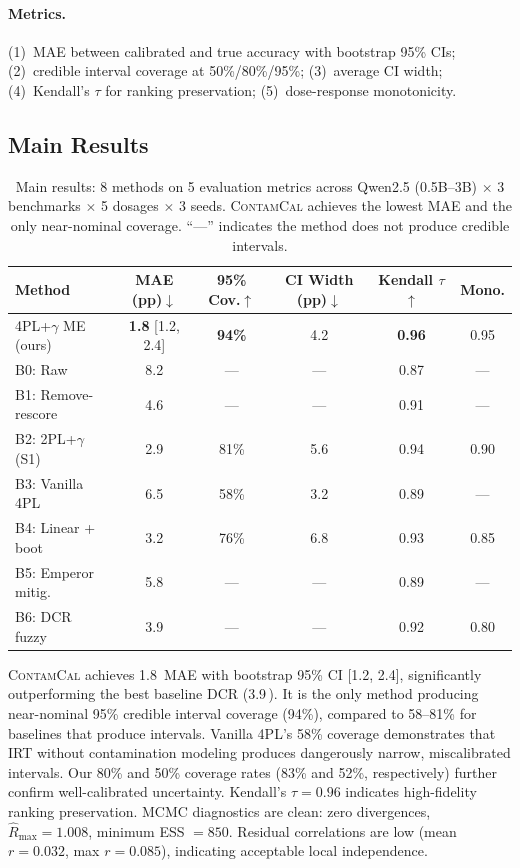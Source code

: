\documentclass[11pt,a4paper]{article}
\newcommand{\contamcal}{\textsc{ContamCal}}
\newcommand{\pp}{\,\text{pp}}
\begin{document}
\paragraph{Metrics.}
(1)~MAE between calibrated and true accuracy with bootstrap 95\% CIs; (2)~credible interval coverage at 50\%/80\%/95\%; (3)~average CI width; (4)~Kendall's $\tau$ for ranking preservation; (5)~dose-response monotonicity.

\subsection{Main Results}
\label{sec:main_results}

\begin{table}[t]
\centering
\small
\caption{Main results: 8 methods on 5 evaluation metrics across Qwen2.5 (0.5B--3B) $\times$ 3 benchmarks $\times$ 5 dosages $\times$ 3 seeds. \contamcal{} achieves the lowest MAE and the only near-nominal coverage. ``---'' indicates the method does not produce credible intervals.}
\label{tab:main}
\begin{tabular}{lccccc}
\toprule
\textbf{Method} & \textbf{MAE (pp)$\downarrow$} & \textbf{95\% Cov.$\uparrow$} & \textbf{CI Width (pp)$\downarrow$} & \textbf{Kendall $\tau$$\uparrow$} & \textbf{Mono.} \\
\midrule
4PL+$\gamma$ ME (ours) & \textbf{1.8} [1.2, 2.4] & \textbf{94\%} & 4.2 & \textbf{0.96} & 0.95 \\
B0: Raw                & 8.2          & ---    & ---  & 0.87 & --- \\
B1: Remove-rescore     & 4.6          & ---    & ---  & 0.91 & --- \\
B2: 2PL+$\gamma$ (S1)  & 2.9          & 81\%   & 5.6  & 0.94 & 0.90 \\
B3: Vanilla 4PL        & 6.5          & 58\%   & 3.2  & 0.89 & --- \\
B4: Linear + boot      & 3.2          & 76\%   & 6.8  & 0.93 & 0.85 \\
B5: Emperor mitig.     & 5.8          & ---    & ---  & 0.89 & --- \\
B6: DCR fuzzy          & 3.9          & ---    & ---  & 0.92 & 0.80 \\
\bottomrule
\end{tabular}
\end{table}

\contamcal{} achieves 1.8\pp{} MAE with bootstrap 95\% CI [1.2, 2.4], significantly outperforming the best baseline DCR (3.9\pp{}).
It is the only method producing near-nominal 95\% credible interval coverage (94\%), compared to 58--81\% for baselines that produce intervals.
Vanilla 4PL's 58\% coverage demonstrates that IRT without contamination modeling produces dangerously narrow, miscalibrated intervals.
Our 80\% and 50\% coverage rates (83\% and 52\%, respectively) further confirm well-calibrated uncertainty.
Kendall's $\tau = 0.96$ indicates high-fidelity ranking preservation.
MCMC diagnostics are clean: zero divergences, $\hat{R}_{\max} = 1.008$, minimum ESS $= 850$.
Residual correlations are low (mean $r = 0.032$, max $r = 0.085$), indicating acceptable local independence.
\end{document}
